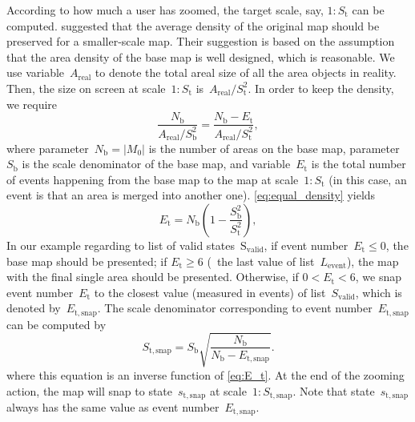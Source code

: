 \documentclass[twocolumn]{svjour3}          %
\begin{document}
According to how much a user has zoomed,
the target scale, say, $1:S_\mathrm{t}$ can be computed.
\citet{Huang2016Webmap} suggested that 
the average density of the original map should be preserved 
for a smaller-scale map.
Their suggestion is based on the assumption that 
the area density of the base map is well designed, which is reasonable.
We use variable~$A_\mathrm{real}$ to denote the total areal size of 
all the area objects in reality.
Then, the size on screen at scale~$1:S_\mathrm{t}$ 
is~$A_\mathrm{real} \big/ S^2_\mathrm{t}$.
In order to keep the density, we require
\begin{equation}
\label{eq:equal_density}
\frac{N_\mathrm{b}}{A_\mathrm{real} \big/ S^2_\mathrm{b}} =
\frac{N_\mathrm{b}-E_\mathrm{t}}{A_\mathrm{real} \big/ S^2_\mathrm{t}},
\end{equation}
where parameter~$N_\mathrm{b} = |M_0|$ 
is the number of areas on the base map,
parameter~$S_\mathrm{b}$ is the scale denominator of the base map,
and variable~$E_\mathrm{t}$ is the total number of events 
happening from the base map to the map at scale~$1:S_\mathrm{t}$
(in this case, an event is that an area is merged into another one).
\eq\ref{eq:equal_density} yields
\begin{equation}
\label{eq:E_t}
E_\mathrm{t} = N_\mathrm{b} \left(1-\frac{S^2_\mathrm{b}}{S^2_\mathrm{t}}\right),
\end{equation}
In our example regarding to list of valid states~$\mathrm{S_\mathrm{valid}}$,
if event number~$E_\mathrm{t} \le 0$, the base map should be presented;
if $E_\mathrm{t} \ge 6$ (\ie~the last value of list~$L_\mathrm{event}$),
the map with the final single area should be presented.
Otherwise, if $0<E_\mathrm{t} < 6$, we snap event number~$E_\mathrm{t}$ 
to the closest value (measured in events) of list~$S_\mathrm{valid}$,
which is denoted by~$E_\mathrm{t,snap}$.
The scale denominator corresponding to event number~$E_\mathrm{t,snap}$
can be computed by 
\begin{equation}
\label{eq:S_t_snap}
S_\mathrm{t,snap} = S_\mathrm{b} \sqrt{\frac{N_\mathrm{b}}{N_\mathrm{b}-E_\mathrm{t,snap}}}.
\end{equation}
where this equation is an inverse function of \eq\ref{eq:E_t}.
At the end of the zooming action, 
the map will snap to state~$s_\mathrm{t,snap}$
at scale~$1:S_\mathrm{t,snap}$.
Note that state~$s_\mathrm{t,snap}$ always has 
the same value as event number~$E_\mathrm{t,snap}$.
\end{document}
